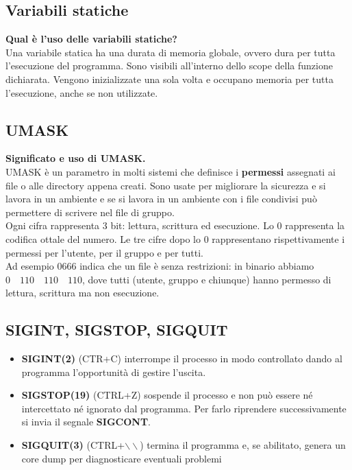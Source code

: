\subsection{Variabili statiche}
\textbf{Qual è l'uso delle variabili statiche?}\\
Una variabile statica ha una durata di memoria globale, ovvero dura per tutta l'esecuzione del programma. Sono visibili all'interno dello scope della funzione dichiarata. Vengono inizializzate una sola volta e occupano memoria per tutta l'esecuzione, anche se non utilizzate.

\subsection{UMASK}
\textbf{Significato e uso di UMASK.}\\
UMASK è un parametro in molti sistemi che definisce i \textbf{permessi} assegnati ai file o alle directory appena creati. Sono usate per migliorare la sicurezza e si lavora in un ambiente e se si lavora in un ambiente con i file condivisi può permettere di scrivere nel file di gruppo.\\
Ogni cifra rappresenta $3$ bit: lettura, scrittura ed esecuzione. Lo $0$ rappresenta la codifica ottale del numero. Le tre cifre dopo lo $0$ rappresentano rispettivamente i permessi per l'utente, per il gruppo e per tutti.\\
Ad esempio $0666$ indica che un file è senza restrizioni: in binario abbiamo $0 \quad 110 \quad 110 \quad 110$, dove tutti (utente, gruppo e chiunque) hanno permesso di lettura, scrittura ma non esecuzione.

\subsection{SIGINT, SIGSTOP, SIGQUIT}
\begin{itemize}
	\item \textbf{SIGINT(2)} (CTR+C) interrompe il processo in modo controllato dando al programma l'opportunità di gestire l'uscita.
	\item \textbf{SIGSTOP(19)} (CTRL+Z) sospende il processo e non può essere né intercettato né ignorato dal programma. Per farlo riprendere successivamente si invia il segnale \textbf{SIGCONT}.
	\item \textbf{SIGQUIT(3)} (CTRL+$\backslash\backslash$) termina il programma e, se abilitato, genera un core dump per diagnosticare eventuali problemi
\end{itemize}

